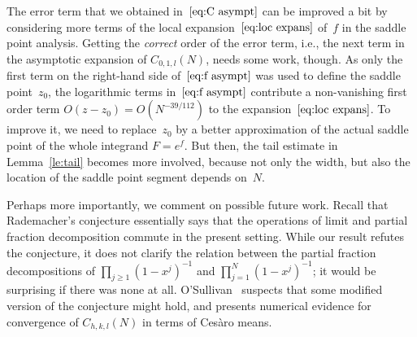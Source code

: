 \documentclass[a4paper]{amsart}
\begin{document}
The error term that we obtained in~$\eqref{eq:C asympt}$ can be improved a bit
by considering more terms of the local expansion~$\eqref{eq:loc expans}$
of~$f$ in the saddle
point analysis. Getting the \emph{correct} order of the error term, i.e.,
the next term in the asymptotic expansion of $C_{0,1,l}(N)$, needs some work, though.
As only the first term on the right-hand side of~$\eqref{eq:f asympt}$
was used to define the saddle point~$z_0$,
the logarithmic terms in~$\eqref{eq:f asympt}$ contribute a non-vanishing
first order term $O(z-z_0)=O(N^{-39/112})$ to the expansion~$\eqref{eq:loc expans}$.
To improve it, we need to
replace~$z_0$ by a better approximation of the actual saddle point
of the whole integrand $F=e^f$. But then, the tail estimate in
Lemma~\ref{le:tail} becomes more involved,
because not only the width, but also the location of the saddle point
segment depends on~$N$.

Perhaps more importantly, we comment on possible future work.
Recall that Rademacher's conjecture essentially says that the operations
of limit and partial fraction decomposition commute in the present setting.
While our result refutes the conjecture, it does not clarify the relation
between the partial fraction decompositions of $\prod_{j\geq 1}(1-x^j)^{-1}$
and $\prod_{j=1}^N(1-x^j)^{-1}$; it would be surprising if there was none at all. O'Sullivan~\cite{oS12} suspects
that some modified version of the conjecture might hold, and presents
numerical evidence for convergence of $C_{h,k,l}(N)$ in terms
of Ces{\`ar}o means.
\end{document}
